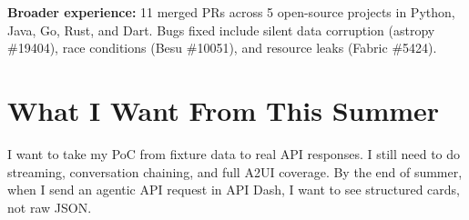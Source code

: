 \documentclass[11pt,a4paper]{article}
\begin{document}
\textbf{Broader experience:} 11 merged PRs across 5 open-source projects in Python, Java, Go, Rust, and Dart. Bugs fixed include silent data corruption (astropy \#19404), race conditions (Besu \#10051), and resource leaks (Fabric \#5424).

\section{What I Want From This Summer}

I want to take my PoC from fixture data to real API responses. I still need to do streaming, conversation chaining, and full A2UI coverage. By the end of summer, when I send an agentic API request in API Dash, I want to see structured cards, not raw JSON.

\label{docendpage}
\end{document}
